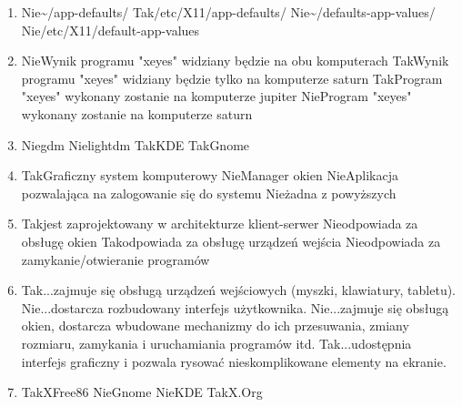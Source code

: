 \begin{enumerate}
	\item {}
	{Nie}{\textasciitilde/app-defaults/}
	{Tak}{/etc/X11/app-defaults/}
	{Nie}{\textasciitilde/defaults-app-values/}
	{Nie}{/etc/X11/default-app-values}
	
	\item {}
	{Nie}{Wynik programu "xeyes" widziany będzie na obu komputerach}
	{Tak}{Wynik programu "xeyes" widziany będzie tylko na komputerze saturn}
	{Tak}{Program "xeyes" wykonany zostanie na komputerze jupiter}
	{Nie}{Program "xeyes" wykonany zostanie na komputerze saturn}

	\item {}
	{Nie}{gdm}
	{Nie}{lightdm}
	{Tak}{KDE}
	{Tak}{Gnome}
	
	\item {}
	{Tak}{Graficzny system komputerowy}
	{Nie}{Manager okien}
	{Nie}{Aplikacja pozwalająca na zalogowanie się do systemu}
	{Nie}{żadna z powyższych}	

	\item {}
	{Tak}{jest zaprojektowany w architekturze klient-serwer}
	{Nie}{odpowiada za obsługę okien}
	{Tak}{odpowiada za obsługę urządzeń wejścia}
	{Nie}{odpowiada za zamykanie/otwieranie programów}

	\newpage

	\item {}
	{Tak}{...zajmuje się obsługą urządzeń wejściowych (myszki, klawiatury, tabletu).}
	{Nie}{...dostarcza rozbudowany interfejs użytkownika.}
	{Nie}{...zajmuje się obsługą okien, dostarcza wbudowane mechanizmy do ich przesuwania, zmiany rozmiaru, zamykania i uruchamiania programów itd.}
	{Tak}{...udostępnia interfejs graficzny i pozwala rysować nieskomplikowane elementy na ekranie.}
	
	\item {}
	{Tak}{XFree86}
	{Nie}{Gnome}
	{Nie}{KDE}
	{Tak}{X.Org}
	

\end{enumerate}
